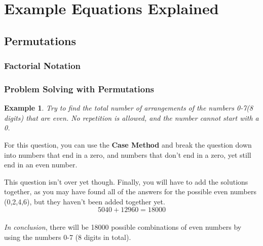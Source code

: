 \documentclass[final,1p,12pt]{elsarticle}
\newtheorem{example}{Example}
\begin{document}

\clearpage\appendix

\section{Example Equations Explained}
    \subsection{Permutations}
        \subsubsection{Factorial Notation}
        \subsubsection{Problem Solving with Permutations}
            \begin{example}
            
            Try to find the total number of arrangements of the numbers 0-7(8 digits) that are even. No repetition is allowed, and the number cannot start with a 0.
            \end{example}
            For this question, you can use the \textbf{Case Method} and break the question down into numbers that end in a zero, and numbers that don't end in a zero, yet still end in an even number. 
            \begin{parcolumns}{2}
            \colplacechunks
            \end{parcolumns}
            This question isn't over yet though. Finally, you will have to add the solutions together, as you may have found all of the answers for the possible even numbers (0,2,4,6), but they haven't been added together yet.
            $$5040 + 12960 = 18000$$\\
            \emph{In conclusion}, there will be 18000 possible combinations of even numbers by using the numbers 0-7 (8 digits in total).
        
\end{document}
